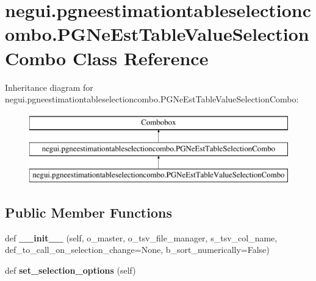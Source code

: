 \hypertarget{classnegui_1_1pgneestimationtableselectioncombo_1_1PGNeEstTableValueSelectionCombo}{}\section{negui.\+pgneestimationtableselectioncombo.\+P\+G\+Ne\+Est\+Table\+Value\+Selection\+Combo Class Reference}
\label{classnegui_1_1pgneestimationtableselectioncombo_1_1PGNeEstTableValueSelectionCombo}
Inheritance diagram for negui.\+pgneestimationtableselectioncombo.\+P\+G\+Ne\+Est\+Table\+Value\+Selection\+Combo\+:\begin{figure}[H]
\begin{center}
\leavevmode
\includegraphics[height=3.000000cm]{classnegui_1_1pgneestimationtableselectioncombo_1_1PGNeEstTableValueSelectionCombo}
\end{center}
\end{figure}
\subsection*{Public Member Functions}
\begin{DoxyCompactItemize}
\item 
def {\bfseries \+\_\+\+\_\+init\+\_\+\+\_\+} (self, o\+\_\+master, o\+\_\+tsv\+\_\+file\+\_\+manager, s\+\_\+tsv\+\_\+col\+\_\+name, def\+\_\+to\+\_\+call\+\_\+on\+\_\+selection\+\_\+change=None, b\+\_\+sort\+\_\+numerically=False)\hypertarget{classnegui_1_1pgneestimationtableselectioncombo_1_1PGNeEstTableValueSelectionCombo_ad4c704a3c76ee9d09c750e013095d192}{}\label{classnegui_1_1pgneestimationtableselectioncombo_1_1PGNeEstTableValueSelectionCombo_ad4c704a3c76ee9d09c750e013095d192}

\item 
def {\bfseries set\+\_\+selection\+\_\+options} (self)\hypertarget{classnegui_1_1pgneestimationtableselectioncombo_1_1PGNeEstTableValueSelectionCombo_a0632136f0eed2ff0ea5b9b8a8f61603a}{}\label{classnegui_1_1pgneestimationtableselectioncombo_1_1PGNeEstTableValueSelectionCombo_a0632136f0eed2ff0ea5b9b8a8f61603a}

\end{DoxyCompactItemize}
